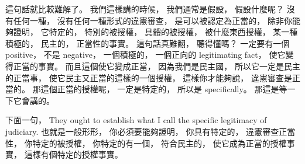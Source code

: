 \hypertarget{w02:cue:526}{}這句話就比較難解了。
\hypertarget{w02:cue:527}{}我們這樣講的時候，
\hypertarget{w02:cue:528}{}我們通常是假設，
\hypertarget{w02:cue:529}{}假設什麼呢？
\hypertarget{w02:cue:530}{}沒有任何一種，
\hypertarget{w02:cue:531}{}沒有任何一種形式的違憲審查，
\hypertarget{w02:cue:532}{}是可以被認定為正當的，
\hypertarget{w02:cue:533}{}除非你能夠證明，
\hypertarget{w02:cue:534}{}它特定的，
\hypertarget{w02:cue:535}{}特別的被授權，
\hypertarget{w02:cue:536}{}具體的被授權，
\hypertarget{w02:cue:537}{}被什麼東西授權，
\hypertarget{w02:cue:538}{}某一種積極的，
\hypertarget{w02:cue:539}{}民主的，
\hypertarget{w02:cue:540}{}正當性的事實。
\hypertarget{w02:cue:541}{}這句話真難翻，
\hypertarget{w02:cue:542}{}聽得懂嗎？
\hypertarget{w02:cue:543}{}一定要有一個 positive，
\hypertarget{w02:cue:544}{}不是 negative，
\hypertarget{w02:cue:545}{}一個積極的，
\hypertarget{w02:cue:546}{}一個正向的 legitimating fact，
\hypertarget{w02:cue:547}{}使它變得正當的事實。
\hypertarget{w02:cue:548}{}而且這個使它變成正當，
\hypertarget{w02:cue:549}{}因為我們是民主國，
\hypertarget{w02:cue:550}{}所以它一定是民主的正當事，
\hypertarget{w02:cue:551}{}使它民主又正當的這樣的一個授權，
\hypertarget{w02:cue:552}{}這樣你才能夠說，
\hypertarget{w02:cue:553}{}違憲審查是正當的。
\hypertarget{w02:cue:554}{}那這個正當的授權呢，
\hypertarget{w02:cue:555}{}一定是特定的，
\hypertarget{w02:cue:556}{}所以是 specifically。
\hypertarget{w02:cue:557}{}那這是等一下它會講的。

\hypertarget{w02:cue:558}{}下面一句，
\hypertarget{w02:cue:559}{}They ought to establish what I call
\hypertarget{w02:cue:560}{}the specific legitimacy of judiciary.
\hypertarget{w02:cue:561}{}也就是一般形形，
\hypertarget{w02:cue:562}{}你必須要能夠證明，
\hypertarget{w02:cue:563}{}你具有特定的，
\hypertarget{w02:cue:564}{}違憲審查正當性，
\hypertarget{w02:cue:565}{}你特定的被授權，
\hypertarget{w02:cue:566}{}你特定的有一個，
\hypertarget{w02:cue:567}{}符合民主的，
\hypertarget{w02:cue:568}{}使它成為正當的授權事實，
\hypertarget{w02:cue:569}{}這樣有個特定的授權事實。

